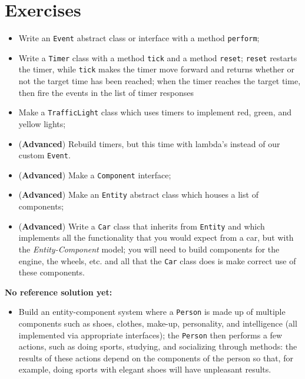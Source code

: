     \section{Exercises}

        \begin{itemize}
            \item Write an \texttt{Event} abstract class or interface with a method \texttt{perform};
            \item Write a \texttt{Timer} class with a method \texttt{tick} and a method \texttt{reset}; \texttt{reset} restarts the timer, while \texttt{tick} makes the timer move forward and returns whether or not the target time has been reached; when the timer reaches the target time, then fire the events in the list of timer responses
            \item Make a \texttt{TrafficLight} class which uses timers to implement red, green, and yellow lights;
            \item (\textbf{Advanced}) Rebuild timers, but this time with lambda's instead of our custom \texttt{Event}.
            \item (\textbf{Advanced}) Make a \texttt{Component} interface;
            \item (\textbf{Advanced}) Make an \texttt{Entity} abstract class which houses a list of components;
            \item (\textbf{Advanced}) Write a \texttt{Car} class that inherits from \texttt{Entity} and which implements all the functionality that you would expect from a car, but with the \textit{Entity-Component} model; you will need to build components for the engine, the wheels, etc. and all that the \texttt{Car} class does is make correct use of these components.
        \end{itemize}

        \textbf{No reference solution yet:}
        \begin{itemize}
            \item Build an entity-component system where a \texttt{Person} is made up of multiple components such as shoes, clothes, make-up, personality, and intelligence (all implemented via appropriate interfaces); the \texttt{Person} then performs a few actions, such as doing sports, studying, and socializing through methods: the results of these actions depend on the components of the person so that, for example, doing sports with elegant shoes will have unpleasant results.
        \end{itemize}

